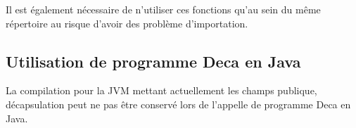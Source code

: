 \documentclass[12pt, a4paper, one side]{article}
\begin{document}
    Il est également nécessaire de n'utiliser ces fonctions qu'au sein du même répertoire au risque d'avoir des problème d'importation.

    \subsection{Utilisation de programme Deca en Java}
    La compilation pour la JVM mettant actuellement les champs publique, décapsulation peut ne pas être conservé lors de l'appelle de programme Deca en Java.

    \newpage
    \printbibliography
\end{document}
